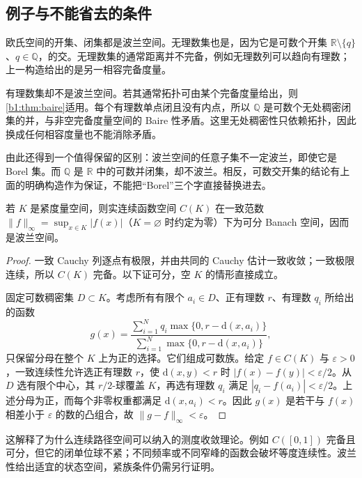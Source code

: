 \subsection{例子与不能省去的条件}
\label{b1:subsec:A10502}

欧氏空间的开集、闭集都是波兰空间。无理数集也是，因为它是可数个开集 \(\mathbb R\setminus\{q\}\)、\(q\in\mathbb Q\)，的交。无理数集的通常距离并不完备，例如无理数列可以趋向有理数；上一构造给出的是另一相容完备度量。

\ProseParagraphBreak

有理数集却不是波兰空间。若其通常拓扑可由某个完备度量给出，则\cref{b1:thm:baire}适用。每个有理数单点闭且没有内点，所以 \(\mathbb Q\) 是可数个无处稠密闭集的并，与非空完备度量空间的 Baire 性矛盾。这里无处稠密性只依赖拓扑，因此换成任何相容度量也不能消除矛盾。

\ProseParagraphBreak

由此还得到一个值得保留的区别：波兰空间的任意子集不一定波兰，即使它是 Borel 集。而 \(\mathbb Q\) 是 \(\mathbb R\) 中的可数并闭集，却不波兰。相反，可数交开集的结论有上面的明确构造作为保证，不能把“Borel”三个字直接替换进去。

\begin{proposition}\label{b1:prop:app-polish-functions}
若 \(K\) 是紧度量空间，则实连续函数空间 \(C(K)\) 在一致范数 \(\|f\|_\infty=\sup_{x\in K}|f(x)|\)（\(K=\varnothing\) 时约定为零）下为可分 Banach 空间，因而是波兰空间。
\end{proposition}
\begin{proof}
一致 Cauchy 列逐点有极限，并由共同的 Cauchy 估计一致收敛；一致极限连续，所以 \(C(K)\) 完备。以下证可分，空 \(K\) 的情形直接成立。

固定可数稠密集 \(D\subset K\)。考虑所有有限个 \(a_i\in D\)、正有理数 \(r\)、有理数 \(q_i\) 所给出的函数
\[
 g(x)=\frac{\sum_{i=1}^N q_i\max\{0,r-\mathrm{d}(x,a_i)\}}
 {\sum_{i=1}^N\max\{0,r-\mathrm{d}(x,a_i)\}},
\]
只保留分母在整个 \(K\) 上为正的选择。它们组成可数族。给定 \(f\in C(K)\) 与 \(\varepsilon>0\)，一致连续性允许选正有理数 \(r\)，使 \(\mathrm{d}(x,y)<r\) 时 \(|f(x)-f(y)|<\varepsilon/2\)。从 \(D\) 选有限个中心，其 \(r/2\)-球覆盖 \(K\)，再选有理数 \(q_i\) 满足 \(|q_i-f(a_i)|<\varepsilon/2\)。上述分母为正，而每个非零权重都满足 \(\mathrm{d}(x,a_i)<r\)。因此 \(g(x)\) 是若干与 \(f(x)\) 相差小于 \(\varepsilon\) 的数的凸组合，故 \(\|g-f\|_\infty<\varepsilon\)。
\end{proof}

这解释了为什么连续路径空间可以纳入的测度收敛理论。例如 \(C([0,1])\) 完备且可分，但它的闭单位球不紧；不同频率或不同窄峰的函数会破坏等度连续性。波兰性给出适宜的状态空间，紧族条件仍需另行证明。

